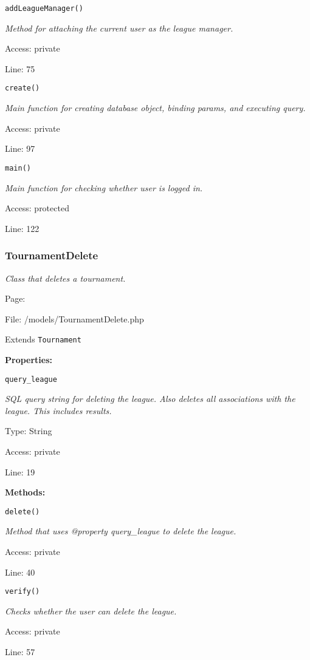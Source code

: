\texttt{addLeagueManager()}

{\scriptsize
\textit{Method for attaching the current user as the league manager.}

Access: private

Line: 75

}

\texttt{create()}

{\scriptsize
\textit{Main function for creating database object, binding params, and executing query.}

Access: private

Line: 97

}

\texttt{main()}

{\scriptsize
\textit{Main function for checking whether user is logged in.}

Access: protected

Line: 122

}

\subsubsection{TournamentDelete}\label{TournamentDelete.php.doc}
\textit{Class that deletes a tournament.}

Page: \pageref{TournamentDelete.php}

File: /models/TournamentDelete.php

Extends \texttt{Tournament}

\textbf{Properties:}

\texttt{query\_league}

{\scriptsize
\textit{SQL query string for deleting the league.
Also deletes all associations with the league.
This includes results.}

Type: String

Access: private

Line: 19

}
\textbf{Methods:}

\texttt{delete()}

{\scriptsize
\textit{Method that uses @property query\_league to delete the league.}

Access: private

Line: 40

}

\texttt{verify()}

{\scriptsize
\textit{Checks whether the user can delete the league.}

Access: private

Line: 57

}

